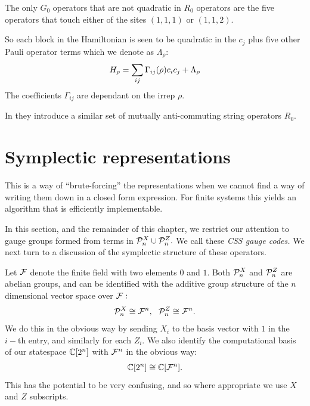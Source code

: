 The only $G_0$ operators that are not 
quadratic in $R_0$ operators are the five
operators that touch either of the sites
$(1,1,1)$ or $(1,1,2)$.

So each block in the Hamiltonian
is seen to be quadratic in the $c_j$ plus
five other Pauli operator terms which we denote as $\Lambda_\rho$:
$$
    H_\rho = \sum_{ij} \Gamma_{ij}(\rho) c_i c_j + \Lambda_\rho
$$
The coefficients $\Gamma_{ij}$ are dependant on the irrep $\rho.$

In \cite{Kells2009} they introduce a similar set of
mutually anti-commuting string operators $R_0.$

%

\def\Cn{\Complex[2^n]}
\def\Cr{\Complex[2^r]}
\def\Fn{\Field^n}
\def\Fm{\Field^m}
\def\Fr{\Field^r}
\def\Fnd{\Field_{n}}
\def\Fmd{\Field_{m}}
\def\Frd{\Field_{r}}


\section{Symplectic representations}

This is a way of ``brute-forcing'' the representations when
we cannot find a way of writing them down in a closed form expression.
For finite systems this yields an algorithm that is efficiently implementable.

In this section, and the remainder of this chapter,
we restrict our
attention to gauge groups formed from terms 
in $\mathcal{P}_n^X\cup\mathcal{P}_n^Z.$
We call these \emph{CSS gauge codes.}
We next turn to a discussion of the symplectic structure of
these operators.

Let $\mathcal{F}$ denote the finite field with two elements $0$ and $1$.
Both $\mathcal{P}^X_n$ and $\mathcal{P}^Z_n$ are abelian groups,
and can be identified with the additive 
group structure of the $n$ dimensional vector space
over $\mathcal{F}:$
$$
    \Pauli^X_n \cong \Fn,  \ \ 
    \Pauli^Z_n \cong \Fn. 
$$
We do this in the obvious way by sending $X_i$ to the basis vector with
$1$ in the $i-$th entry, and similarly for each $Z_i$. 
We also identify the computational basis of our statespace $\mathbb{C}[2^n]$
with $\Fn$ in the obvious way:
$$
\Complex[2^n] \cong \Complex[\Fn].
$$
This has the potential to be very confusing, and
so where appropriate we use $X$ and $Z$ subscripts.

